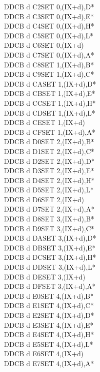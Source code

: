 \documentclass[oneside,a4paper]{book}
\begin{document}
\begin{multicols}{3}
{\begin{tabbing}
DDCB d C2\>SET 0,(IX+d),D*\\
DDCB d C3\>SET 0,(IX+d),E*\\
DDCB d C4\>SET 0,(IX+d),H*\\
DDCB d C5\>SET 0,(IX+d),L*\\
DDCB d C6\>SET 0,(IX+d)\\
DDCB d C7\>SET 0,(IX+d),A*\\
DDCB d C8\>SET 1,(IX+d),B*\\
DDCB d C9\>SET 1,(IX+d),C*\\
DDCB d CA\>SET 1,(IX+d),D*\\
DDCB d CB\>SET 1,(IX+d),E*\\
DDCB d CC\>SET 1,(IX+d),H*\\
DDCB d CD\>SET 1,(IX+d),L*\\
DDCB d CE\>SET 1,(IX+d)\\
DDCB d CF\>SET 1,(IX+d),A*\\
DDCB d D0\>SET 2,(IX+d),B*\\
DDCB d D1\>SET 2,(IX+d),C*\\
DDCB d D2\>SET 2,(IX+d),D*\\
DDCB d D3\>SET 2,(IX+d),E*\\
DDCB d D4\>SET 2,(IX+d),H*\\
DDCB d D5\>SET 2,(IX+d),L*\\
DDCB d D6\>SET 2,(IX+d)\\
DDCB d D7\>SET 2,(IX+d),A*\\
DDCB d D8\>SET 3,(IX+d),B*\\
DDCB d D9\>SET 3,(IX+d),C*\\
DDCB d DA\>SET 3,(IX+d),D*\\
DDCB d DB\>SET 3,(IX+d),E*\\
DDCB d DC\>SET 3,(IX+d),H*\\
DDCB d DD\>SET 3,(IX+d),L*\\
DDCB d DE\>SET 3,(IX+d)\\
DDCB d DF\>SET 3,(IX+d),A*\\
DDCB d E0\>SET 4,(IX+d),B*\\
DDCB d E1\>SET 4,(IX+d),C*\\
DDCB d E2\>SET 4,(IX+d),D*\\
DDCB d E3\>SET 4,(IX+d),E*\\
DDCB d E4\>SET 4,(IX+d),H*\\
DDCB d E5\>SET 4,(IX+d),L*\\
DDCB d E6\>SET 4,(IX+d)\\
DDCB d E7\>SET 4,(IX+d),A*\\

\end{tabbing}}
\end{multicols}
\end{document}

